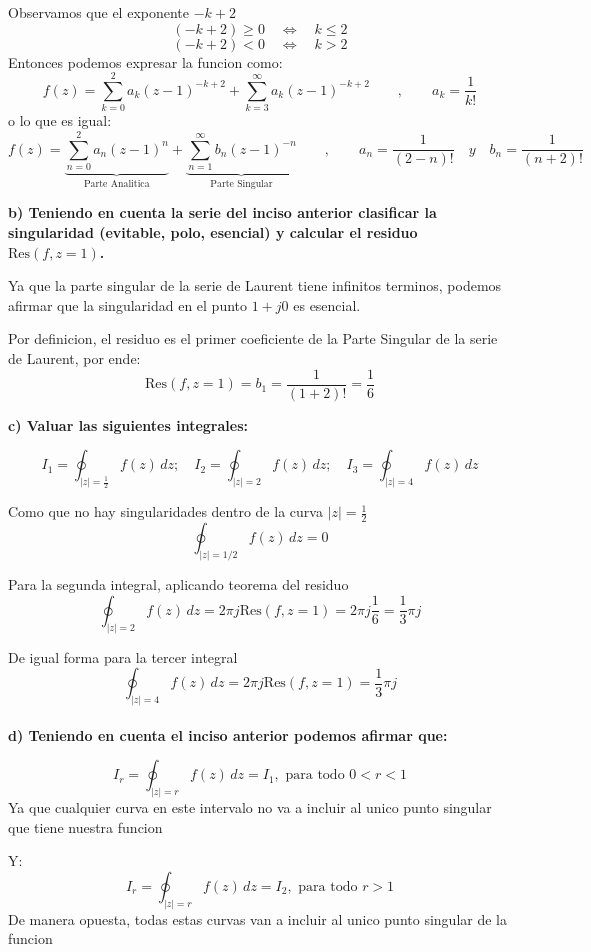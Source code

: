 \documentclass[12pt,a4paper]{report}
\begin{document}
Observamos que el exponente $-k+2$
$$(-k+2) \geq 0 \quad \Leftrightarrow \quad k \leq 2$$
$$(-k+2) < 0 \quad \Leftrightarrow \quad k>2$$
Entonces podemos expresar la funcion como:
$$f(z) = \sum_{k=0}^{2}a_k(z - 1)^{-k+2} + \sum_{k=3}^{\infty}a_k(z - 1)^{-k+2}\qquad, \qquad a_k=\frac{1}{k!}$$
o lo que es igual:
$$f(z) = \underbrace{\sum_{n=0}^{2}a_n(z - 1)^{n}}_{\text{Parte Analitica}} + \underbrace{\sum_{n=1}^{\infty}b_n(z - 1)^{-n}}_{\text{Parte Singular}}
\qquad, \qquad a_n=\frac{1}{(2-n)!}\quad y \quad b_n=\frac{1}{(n+2)!}$$

\textbf{b)  Teniendo en cuenta la serie del inciso anterior clasificar la singularidad (evitable, polo, 
esencial) y calcular el residuo \( \text{Res}(f, z = 1) \).}

Ya que la parte singular de la serie de Laurent tiene infinitos terminos, podemos afirmar que la singularidad
en el punto $1+j0$ es esencial.

Por definicion, el residuo es el primer coeficiente de la Parte Singular de la serie de Laurent, por ende:
$$\text{Res}(f, z = 1) = b_1=\frac{1}{(1+2)!} = \frac{1}{6}$$

\textbf{c)  Valuar las siguientes integrales:}

$$ I_1 = \oint_{|z| =\frac{1}{2}} f(z) \, dz; \quad I_2 = \oint_{|z| = 2} f(z) \, dz; \quad I_3 = \oint_{|z| = 4} f(z) \, dz $$

Como que no hay singularidades dentro de la curva $|z|=\frac{1}{2}$
$$\oint_{|z| = 1/2} f(z) \, dz = 0$$

Para la segunda integral, aplicando teorema del residuo
$$\oint_{|z| = 2} f(z) \, dz = 2\pi j \text{Res}(f, z = 1) = 2\pi j\frac{1}{6}=\frac{1}{3}\pi j$$

De igual forma para la tercer integral
$$\oint_{|z| = 4} f(z) \, dz = 2\pi j \text{Res}(f, z = 1) =\frac{1}{3}\pi j$$\\

\textbf{d)  Teniendo en cuenta el inciso anterior podemos afirmar que:}

$$ I_r = \oint_{|z| = r} f(z) \, dz = I_1, \text{ para todo } 0 < r < 1 $$ 
Ya que cualquier curva en este intervalo no va a incluir al unico punto singular que tiene nuestra funcion

Y:
$$ I_r = \oint_{|z| = r} f(z) \, dz = I_2, \text{ para todo } r > 1 $$ 
De manera opuesta, todas estas curvas van a incluir al unico punto singular de la funcion

\chapter{}%
\end{document}
